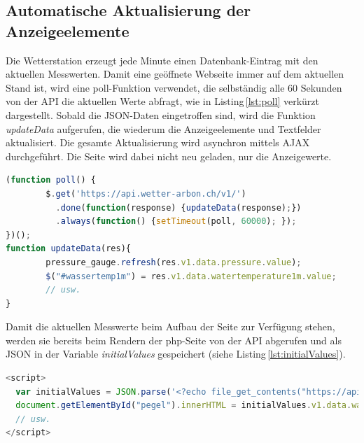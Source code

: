 \subsection{Automatische Aktualisierung der Anzeigeelemente}
Die Wetterstation erzeugt jede Minute einen Datenbank-Eintrag mit den aktuellen Messwerten. Damit eine geöffnete Webseite immer auf dem aktuellen Stand ist, wird eine poll-Funktion verwendet, die selbständig alle 60 Sekunden von der API die aktuellen Werte abfragt, wie in Listing\,\ref{lst:poll} verkürzt dargestellt. Sobald die JSON-Daten eingetroffen sind, wird die Funktion \textit{updateData} aufgerufen, die wiederum die Anzeigeelemente und Textfelder aktualisiert. Die gesamte Aktualisierung wird asynchron mittels AJAX durchgeführt. Die Seite wird dabei nicht neu geladen, nur die Anzeigewerte. \newline


\begin{lstlisting}[label=lst:poll,caption=Automatische Aktualisierung der Werte, language=JavaScript, style=htmlcssjs]
(function poll() {
        $.get('https://api.wetter-arbon.ch/v1/')
          .done(function(response) {updateData(response);})
          .always(function() {setTimeout(poll, 60000); });
})();
function updateData(res){
        pressure_gauge.refresh(res.v1.data.pressure.value);
        $("#wassertemp1m") = res.v1.data.watertemperature1m.value;
        // usw.
}
\end{lstlisting}

\noindent
Damit die aktuellen Messwerte beim Aufbau der Seite zur Verfügung stehen, werden sie bereits beim Rendern der php-Seite von der API abgerufen und als JSON in der Variable \emph{initialValues} gespeichert (siehe Listing\,\ref{lst:initialValues}).

\begin{lstlisting}[label=lst:initialValues,caption=Übergabe der Initialisierungswerte durch php, language=JavaScript, style=htmlcssjs]
<script>
  var initialValues = JSON.parse('<?echo file_get_contents("https://api.wetter-arbon.ch/v1/");?>');
  document.getElementById("pegel").innerHTML = initialValues.v1.data.waterlevel.value;
  // usw.
</script>

\end{lstlisting}

